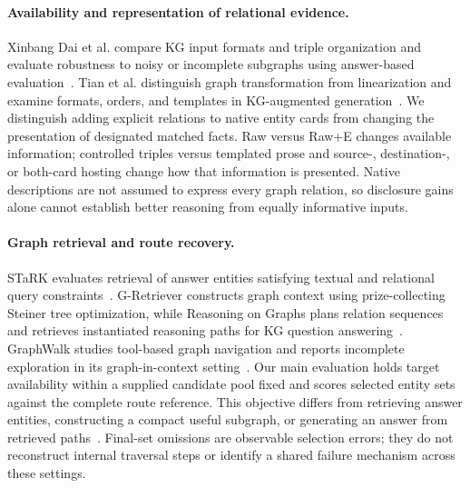 \paragraph{Availability and representation of relational evidence.}
Xinbang Dai et al. compare KG input formats and triple organization and evaluate robustness to noisy or incomplete subgraphs using answer-based evaluation~\cite{dai2024kgunderstanding}. Tian et al. distinguish graph transformation from linearization and examine formats, orders, and templates in KG-augmented generation~\cite{tian2025alignment}. We distinguish adding explicit relations to native entity cards from changing the presentation of designated matched facts. Raw versus Raw+E changes available information; controlled triples versus templated prose and source-, destination-, or both-card hosting change how that information is presented. Native descriptions are not assumed to express every graph relation, so disclosure gains alone cannot establish better reasoning from equally informative inputs.

\paragraph{Graph retrieval and route recovery.}
STaRK evaluates retrieval of answer entities satisfying textual and relational query constraints~\cite{wu2024stark}. G-Retriever constructs graph context using prize-collecting Steiner tree optimization, while Reasoning on Graphs plans relation sequences and retrieves instantiated reasoning paths for KG question answering~\cite{he2024gretriever,luo2024rog}. GraphWalk studies tool-based graph navigation and reports incomplete exploration in its graph-in-context setting~\cite{ghandi2026graphwalk}. Our main evaluation holds target availability within a supplied candidate pool fixed and scores selected entity sets against the complete route reference. This objective differs from retrieving answer entities, constructing a compact useful subgraph, or generating an answer from retrieved paths~\cite{wu2024stark,he2024gretriever,luo2024rog}. Final-set omissions are observable selection errors; they do not reconstruct internal traversal steps or identify a shared failure mechanism across these settings.


